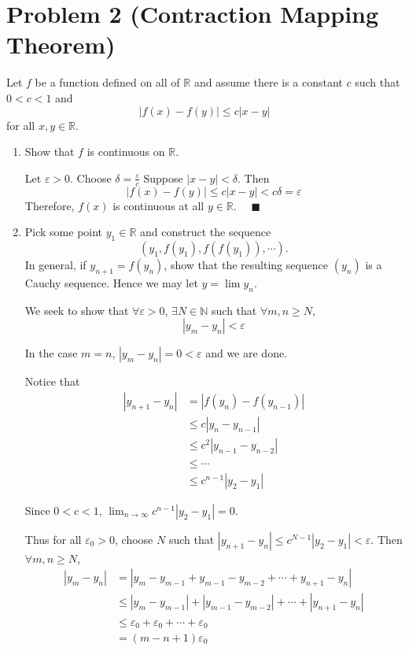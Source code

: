 \documentclass[12pt]{article}
\newcommand{\R}{\mathbb{R}}
\newcommand{\N}{\mathbb{N}}
\newcommand{\qed}{\quad \blacksquare}
\newcommand{\abs}[1]{\left\vert #1 \right\vert}
\newcommand{\ep}{\varepsilon}
\begin{document}
\section*{Problem 2 (Contraction Mapping Theorem)}
Let $f$ be a function defined on all of $\mathbb{R}$ and assume there is a constant $c$ such that $0<c<1$ and 
\begin{equation*}
	\abs{f(x)-f(y)}\leq c\abs{x-y}
\end{equation*}
for all $x,y\in\mathbb{R}$.
\begin{enumerate}
	\item Show that $f$ is continuous on $\mathbb{R}$.
    
        \color{blue}
            Let $\ep > 0$. Choose $\delta = \frac{\ep}{c}$ Suppose $\abs{x - y} < \delta$. Then 
            \[\abs{f(x) - f(y)} \leq c\abs{x- y} < c\delta = \ep\]
            Therefore, $f(x)$ is continuous at all $y \in \R$. $\qed$
        \color{black}

	\item Pick some point $y_1\in\mathbb{R}$ and construct the sequence $$(y_1,f(y_1),f(f(y_1)),\cdots).$$
	In general, if $y_{n+1}=f(y_n)$, show that the resulting sequence $(y_n)$ is a Cauchy sequence. Hence we may let $y=\lim y_n$.

        \color{blue}
            We seek to show that $\forall \ep > 0$, $\exists N \in \N$ such that $\forall m,n \geq N$, 
            \[\abs{y_m - y_n} < \ep\]

            In the case $m = n$, $\abs{y_m - y_n} = 0 < \ep$ and we are done.

            Notice that 
            \begin{align*}
                \abs{y_{n+1} - y_n} &= \abs{f(y_n) - f(y_{n-1})}\\
                &\leq c\abs{y_n - y_{n-1}}\\
                &\leq c^2\abs{y_{n-1} - y_{n-2}}\\
                &\leq \cdots\\
                &\leq c^{n-1}\abs{y_2 - y_1}
            \end{align*}

            Since $0 < c < 1$, $\lim_{n\to\infty} c^{n-1} \abs{y_2-y_1} = 0$. 
           
            Thus for all $\ep_0 > 0$, choose $N$ such that $\abs{y_{n+1} - y_n} \leq c^{N-1}\abs{y_2 - y_1} < \ep$. Then $\forall m,n \geq N$,
            \begin{align*}
                \abs{y_m - y_n} &= \abs{y_m - y_{m-1} + y_{m-1} - y_{m-2} + \cdots + y_{n+1} - y_n}\\
                &\leq \abs{y_m - y_{m-1}} + \abs{y_{m-1} - y_{m-2}} + \cdots + \abs{y_{n+1} - y_n}\\
                &\leq \ep_0 + \ep_0 + \cdots + \ep_0\\ 
                &= (m - n + 1)\ep_0
            \end{align*}


\end{enumerate}
\end{document}
